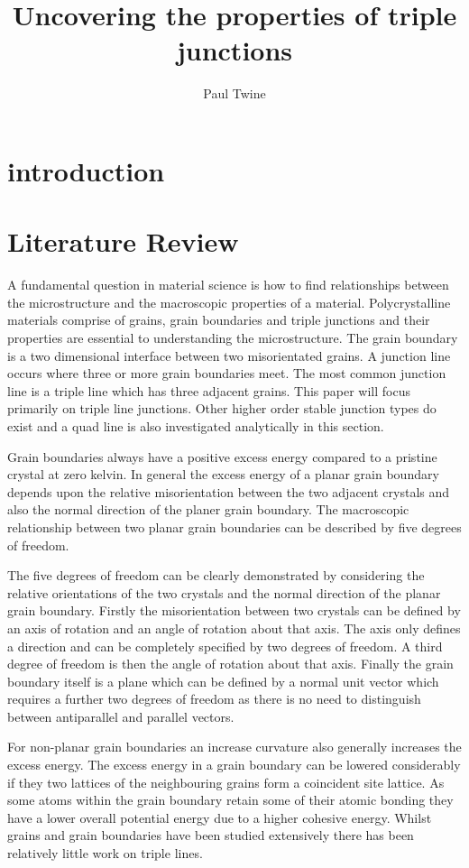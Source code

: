 \documentclass[12pt,a4paper]{book}
\title{Uncovering the properties of triple junctions}
\author{Paul Twine}
\begin{document}
\maketitle

\chapter{introduction}
\chapter{Literature Review}

\nocite{*}
A fundamental question in material science is how to find relationships between the microstructure and the macroscopic properties of a material. Polycrystalline materials comprise of grains, grain boundaries and triple junctions and their properties are essential to understanding the microstructure. The grain boundary is a two dimensional interface between two misorientated grains. A junction line occurs where three or more grain boundaries meet. The most common junction line is a triple line which has three adjacent grains. This paper will focus primarily on triple line junctions. Other higher order stable junction types do exist and a quad line is also investigated analytically in this section. 

Grain boundaries always have a positive excess energy compared to a pristine crystal at zero kelvin. In general the excess energy of a planar grain boundary depends upon the relative misorientation between the two adjacent crystals and also the normal direction of the planer grain boundary. The macroscopic relationship between two planar grain boundaries can be described by five degrees of freedom. 

The five degrees of freedom can be clearly demonstrated by considering the relative orientations of the two crystals and the normal direction of the planar grain boundary. Firstly the misorientation between two crystals can be defined by an axis of rotation and an angle of rotation about that axis.  The axis only defines a direction and can be completely specified by two degrees of freedom. A third degree of freedom is then the angle of rotation about that axis. Finally the grain boundary itself is a plane which can be defined by a normal unit vector which requires a further two degrees of freedom as there is no need to distinguish between antiparallel and parallel vectors.


For non-planar grain boundaries an increase curvature also generally increases the excess energy.  The excess energy in a grain boundary can be lowered considerably if they two lattices of the neighbouring grains form a coincident site lattice. As some atoms within the grain boundary retain some of their atomic bonding they have a lower overall potential energy due to a higher cohesive energy. Whilst grains and grain boundaries have been studied extensively there has been relatively little work on triple lines.
\end{document}
